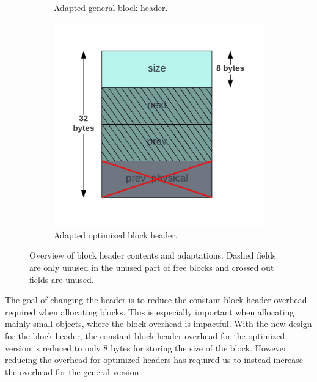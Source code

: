 \begin{figure}[H]
\begin{subfigure}[b]{0.3\textwidth}
        \caption{Adapted general block header.}
        \label{fig:blockheader_adap_general}
    \end{subfigure}%
    \hfill
    \begin{subfigure}[b]{0.3\textwidth}
        \centering
        \includegraphics[width=\textwidth]{figures/blockheader_adap_optimized.png}
        \caption{Adapted optimized block header.}
        \label{fig:blockheader_adap_optimized}
    \end{subfigure}
    \caption{Overview of block header contents and adaptations. Dashed fields are only unused in the unused part of free blocks and crossed out fields are unused.}
    \label{fig:blockheader_adaptations}
\end{figure}

The goal of changing the header is to reduce the constant block header overhead required when allocating blocks. This is especially important when allocating mainly small objects, where the block overhead is impactful. With the new design for the block header, the constant block header overhead for the optimized version is reduced to only 8 bytes for storing the size of the block. However, reducing the overhead for optimized headers has required us to instead increase the overhead for the general version.


